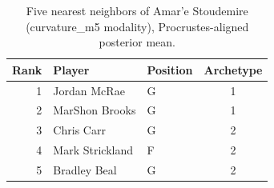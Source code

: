\begin{table}[htbp]
  \centering\small
  \begin{tabular}{rllc}
    \toprule
    Rank & Player & Position & Archetype \\
    \midrule
    1 & Jordan McRae & G & 1 \\
    2 & MarShon Brooks & G & 1 \\
    3 & Chris Carr & G & 2 \\
    4 & Mark Strickland & F & 2 \\
    5 & Bradley Beal & G & 2 \\
    \bottomrule
  \end{tabular}
  \caption{Five nearest neighbors of Amar'e Stoudemire (curvature_m5 modality), Procrustes-aligned posterior mean.}
  \label{tab:Amar_e_Stoudemire_neighbors_curvature_m5}
\end{table}

